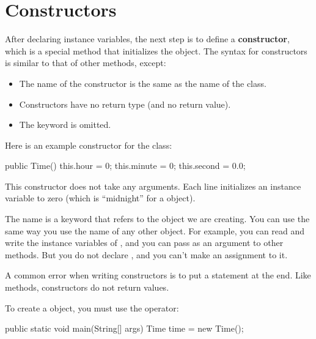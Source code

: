 \section{Constructors}


After declaring instance variables, the next step is to define a {\bf constructor}, which is a special method that initializes the object.
The syntax for constructors is similar to that of other methods, except:


\begin{itemize}

\item The name of the constructor is the same as the name of the class.

\item Constructors have no return type (and no return value).

\item The keyword  is omitted.

\end{itemize}

Here is an example constructor for the  class:

\begin{code}
public Time() {
    this.hour = 0;
    this.minute = 0;
    this.second = 0.0;
}
\end{code}

This constructor does not take any arguments.
Each line initializes an instance variable to zero (which is ``midnight'' for a  object).


The name  is a keyword that refers to the object we are creating.
You can use  the same way you use the name of any other object.
For example, you can read and write the instance variables of , and you can pass  as an argument to other methods.
But you do not declare , and you can't make an assignment to it.

A common error when writing constructors is to put a  statement at the end.
Like  methods, constructors do not return values.

To create a  object, you must use the  operator:

\begin{code}
public static void main(String[] args) {
    Time time = new Time();
}
\end{code}

